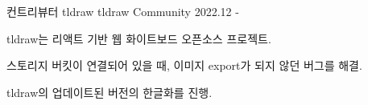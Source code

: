 \begin{cventries}
  \cventry
  {컨트리뷰터} %
  {tldraw} %
  {tldraw Community} %
  {2022.12 - } %
  {
    \begin{cvitems} %
      \item {tldraw는 리액트 기반 웹 화이트보드 오픈소스 프로젝트.}
      \item {스토리지 버킷이 연결되어 있을 때, 이미지 export가 되지 않던 버그를 해결.}      
      \item {tldraw의 업데이트된 버전의 한글화를 진행.}
    \end{cvitems}
  }

\end{cventries}
